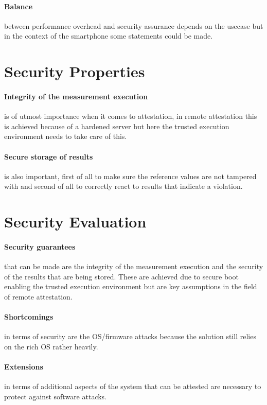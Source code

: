 \documentclass{report}
\begin{document}
\paragraph*{Balance}
between performance overhead and security assurance depends on the usecase but in the context of the smartphone some statements could be made.

\section{Security Properties}

\paragraph*{Integrity of the measurement execution}
is of utmost importance when it comes to attestation, in remote attestation this is achieved because of a hardened server but here the trusted execution environment needs to take care of this.

\paragraph*{Secure storage of results}
is also important, first of all to make sure the reference values are not tampered with and second of all to correctly react to results that indicate a violation.

\section{Security Evaluation}

\paragraph*{Security guarantees}
that can be made are the integrity of the measurement execution and the security of the results that are being stored. These are achieved due to secure boot enabling the trusted execution environment but are key assumptions in the field of remote attestation.

\paragraph*{Shortcomings}
in terms of security are the OS/firmware attacks because the solution still relies on the rich OS rather heavily.

\paragraph*{Extensions}
in terms of additional aspects of the system that can be attested are necessary to protect against software attacks.
\end{document}
